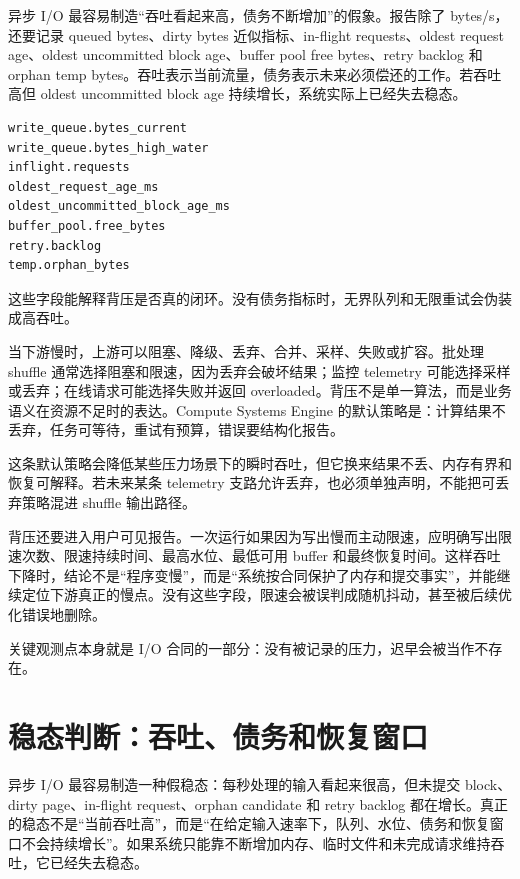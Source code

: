 异步 I/O 最容易制造“吞吐看起来高，债务不断增加”的假象。报告除了 bytes/s，还要记录 queued bytes、dirty bytes 近似指标、in-flight requests、oldest request age、oldest uncommitted block age、buffer pool free bytes、retry backlog 和 orphan temp bytes。吞吐表示当前流量，债务表示未来必须偿还的工作。若吞吐高但 oldest uncommitted block age 持续增长，系统实际上已经失去稳态。

\begin{lstlisting}[numbers=none,caption={I/O 债务指标}]
write_queue.bytes_current
write_queue.bytes_high_water
inflight.requests
oldest_request_age_ms
oldest_uncommitted_block_age_ms
buffer_pool.free_bytes
retry.backlog
temp.orphan_bytes
\end{lstlisting}

这些字段能解释背压是否真的闭环。没有债务指标时，无界队列和无限重试会伪装成高吞吐。

当下游慢时，上游可以阻塞、降级、丢弃、合并、采样、失败或扩容。批处理 shuffle 通常选择阻塞和限速，因为丢弃会破坏结果；监控 telemetry 可能选择采样或丢弃；在线请求可能选择失败并返回 overloaded。背压不是单一算法，而是业务语义在资源不足时的表达。Compute Systems Engine 的默认策略是：计算结果不丢弃，任务可等待，重试有预算，错误要结构化报告。

这条默认策略会降低某些压力场景下的瞬时吞吐，但它换来结果不丢、内存有界和恢复可解释。若未来某条 telemetry 支路允许丢弃，也必须单独声明，不能把可丢弃策略混进 shuffle 输出路径。

背压还要进入用户可见报告。一次运行如果因为写出慢而主动限速，应明确写出限速次数、限速持续时间、最高水位、最低可用 buffer 和最终恢复时间。这样吞吐下降时，结论不是“程序变慢”，而是“系统按合同保护了内存和提交事实”，并能继续定位下游真正的慢点。没有这些字段，限速会被误判成随机抖动，甚至被后续优化错误地删除。

关键观测点本身就是 I/O 合同的一部分：没有被记录的压力，迟早会被当作不存在。

\section{稳态判断：吞吐、债务和恢复窗口}

异步 I/O 最容易制造一种假稳态：每秒处理的输入看起来很高，但未提交 block、dirty page、in-flight request、orphan candidate 和 retry backlog 都在增长。真正的稳态不是“当前吞吐高”，而是“在给定输入速率下，队列、水位、债务和恢复窗口不会持续增长”。如果系统只能靠不断增加内存、临时文件和未完成请求维持吞吐，它已经失去稳态。

